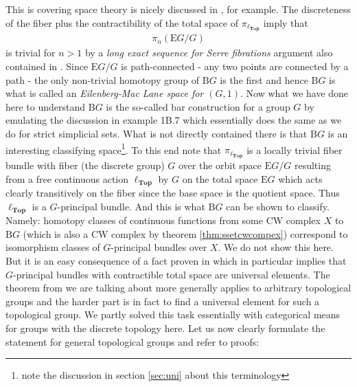 This is covering space theory is nicely discussed in \cite{8b5861fc}, for example. The discreteness of the fiber plus the contractibility of the total space of $\pi_{\ell_{\mathbf{Top}}}$ imply that
\begin{align*}
  \pi_{n}(\mathrm{E}G \slash G)
\end{align*}
is trivial for $n > 1$ by a \textit{long exact sequence for Serre fibrations} argument also contained in \cite{8b5861fc}. Since $\mathrm{E}G \slash G$ is path-connected - any two points are connected by a path - the only non-trivial homotopy group of $\mathrm{B}G$ is the first and hence $\mathrm{B}G$ is what is called an \textit{Eilenberg-Mac Lane space for $(G,1)$}. Now what we have done here to understand $\mathrm{B}G$ is the so-called {\glqq}bar construction{\grqq} for a group $G$ by emulating the discussion in \cite{8b5861fc} example 1B.7 which essentially does the same as we do for strict simplicial sets. What is not directly contained there is that $\mathrm{B}G$ is an interesting classifying space\footnote{note the discussion in section \ref{sec:uni} about this terminology}. To this end note that $\pi_{\ell_{\mathbf{Top}}}$ is a locally trivial fiber bundle with fiber (the discrete group) $G$ over the orbit space $\mathrm{E}G \slash G$ resulting from a free continuous action $\ell_{\mathbf{Top}}$ by $G$ on the total space $\mathrm{E}G$ which acts clearly transitively on the fiber since the base space is the quotient space. Thus $\ell_{\mathbf{Top}}$ is a $G$-principal bundle. And this is what $\mathrm{B}G$ can be shown to classify. Namely: homotopy classes of continuous functions from some CW complex $X$ to $\mathrm{B}G$ (which is also a CW complex by theorem \ref{thm:ssetcwcompex}) correspond to isomorphism classes of $G$-principal bundles over $X$. We do not show this here. But it is an easy consequence of a fact proven in \cite{4dc38f27} which in particular implies that $G$-principal bundles with contractible total space are universal elements. The theorem from \cite{4dc38f27} we are talking about more generally applies to arbitrary topological groups and the harder part is in fact to find a universal element for such a topological group. We partly solved this task essentially with categorical means for groups with the discrete topology here. Let us now clearly formulate the statement for general topological groups and refer to proofs:
\\
